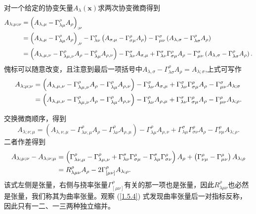 \documentclass[11pt, a4paper, oneside, onecolumn]{ctexart}
\numberwithin{equation}{subsection}
\begin{document}
对一个给定的协变矢量$A_{\lambda}\left(\boldsymbol{x}\right)$求两次协变微商得到
\begin{align}
A_{\lambda;\mu;\nu}&=\left(A_{\lambda,\mu}-\Gamma_{\lambda\mu}^{\rho}A_{\rho}\right)_{;\nu}\notag\\
&=\left(A_{\lambda,\mu}-\Gamma_{\lambda\mu}^{\rho}A_{\rho}\right)_{,\nu}-\Gamma_{\lambda\nu}^{\sigma}\left(A_{\sigma,\mu}-\Gamma_{\sigma\mu}^{\rho}A_{\rho}\right)-\Gamma_{\mu\nu}^{\sigma}\left(A_{\lambda,\sigma}-\Gamma_{\lambda\sigma}^{\rho}A_{\rho}\right)\notag\\
&=\left(A_{\lambda,\mu,\nu}-\Gamma_{\lambda\mu,\nu}^{\rho}A_{\rho}-\Gamma_{\lambda\mu}^{\rho}A_{\rho,\nu}\right)-\Gamma_{\lambda\nu}^{\sigma}A_{\sigma,\mu}+\Gamma_{\lambda\nu}^{\sigma}\Gamma_{\sigma\mu}^{\rho}A_{\rho}-\Gamma_{\mu\nu}^{\sigma}\left(A_{\lambda,\sigma}-\Gamma_{\lambda\sigma}^{\rho}A_{\rho}\right).
\end{align}
傀标可以随意改变，且注意到最后一项括号中$A_{\lambda,\sigma}-\Gamma_{\lambda\sigma}^{\rho}A_{\rho}=A_{\lambda;\sigma}$,上式可写作
\begin{align}
A_{\lambda;\mu;\nu}&=\left(A_{\lambda,\mu,\nu}-\Gamma_{\lambda\mu,\nu}^{\rho}A_{\rho}-\Gamma_{\lambda\mu}^{\rho}A_{\rho,\nu}\right)-\Gamma_{\lambda\nu}^{\sigma}A_{\sigma,\mu}+\Gamma_{\lambda\nu}^{\sigma}\Gamma_{\sigma\mu}^{\rho}A_{\rho}-\Gamma_{\mu\nu}^{\sigma}A_{\lambda;\sigma}\notag\\
&=\left(A_{\lambda,\mu,\nu}-\Gamma_{\lambda\mu,\nu}^{\rho}A_{\rho}-\Gamma_{\lambda\mu}^{\rho}A_{\rho,\nu}\right)-\Gamma_{\lambda\nu}^{\rho}A_{\rho,\mu}+\Gamma_{\lambda\nu}^{\sigma}\Gamma_{\sigma\mu}^{\rho}A_{\rho}-\Gamma_{\mu\nu}^{\rho}A_{\lambda;\rho}.
\end{align}

交换微商顺序，得到
\begin{equation}
A_{\lambda;\nu;\mu}=\left(A_{\lambda,\nu,\mu}-\Gamma_{\lambda\nu,\mu}^{\rho}A_{\rho}-\Gamma_{\lambda\nu}^{\rho}A_{\rho,\mu}\right)-\Gamma_{\lambda\mu}^{\rho}A_{\rho,\nu}+\Gamma_{\lambda\mu}^{\sigma}\Gamma_{\sigma\nu}^{\rho}A_{\rho}-\Gamma_{\nu\mu}^{\rho}A_{\lambda;\rho}.
\end{equation}
二者作差得到
\begin{align}
A_{\lambda;\mu;\nu}-A_{\lambda;\nu;\mu}&=\left(\Gamma_{\lambda\nu,\mu}^{\rho}-\Gamma_{\lambda\mu,\nu}^{\rho}+\Gamma_{\lambda\nu}^{\sigma}\Gamma_{\sigma\mu}^{\rho}-\Gamma_{\lambda\mu}^{\sigma}\Gamma_{\sigma\nu}^{\rho}\right)A_{\rho}+\left(\Gamma_{\nu\mu}^{\rho}-\Gamma_{\mu\nu}^{\rho}\right)A_{\lambda;\rho}\notag\\
&=R_{\lambda\mu\nu}^{\rho}A_{\rho}-2\Gamma^{\rho}_{\left[\mu\nu\right]}A_{\lambda;\rho}.\label{1.5.4}
\end{align}
该式左侧是张量，右侧与挠率张量$\Gamma^{\rho}_{\left[\mu\nu\right]}$有关的那一项也是张量，因此$R_{\lambda\mu\nu}^{\rho}$也必然是张量，我们称其为曲率张量。观察 (\ref{1.5.4}) 式发现曲率张量后一对指标反称，因此只有一二、一三两种独立缩并。
\end{document}
